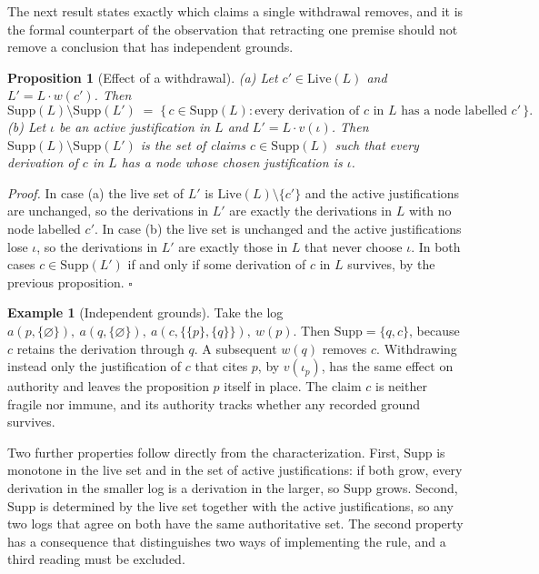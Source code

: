 \documentclass[11pt]{article}
\theoremstyle{plain}
\newtheorem{proposition}{Proposition}
\theoremstyle{definition}
\newtheorem{example}{Example}
\theoremstyle{remark}
\begin{document}
The next result states exactly which claims a single withdrawal removes, and it is the formal counterpart of the observation that retracting one premise should not remove a conclusion that has independent grounds.

\begin{proposition}[Effect of a withdrawal]
(a) Let $c'\in\mathrm{Live}(L)$ and $L'=L\cdot w(c')$. Then
\[
\mathrm{Supp}(L)\setminus\mathrm{Supp}(L') \;=\; \{\,c\in\mathrm{Supp}(L) : \text{every derivation of } c \text{ in } L \text{ has a node labelled } c'\,\}.
\]
(b) Let $\iota$ be an active justification in $L$ and $L'=L\cdot v(\iota)$. Then $\mathrm{Supp}(L)\setminus\mathrm{Supp}(L')$ is the set of claims $c\in\mathrm{Supp}(L)$ such that every derivation of $c$ in $L$ has a node whose chosen justification is $\iota$.
\end{proposition}
\emph{Proof.} In case (a) the live set of $L'$ is $\mathrm{Live}(L)\setminus\{c'\}$ and the active justifications are unchanged, so the derivations in $L'$ are exactly the derivations in $L$ with no node labelled $c'$. In case (b) the live set is unchanged and the active justifications lose $\iota$, so the derivations in $L'$ are exactly those in $L$ that never choose $\iota$. In both cases $c\in\mathrm{Supp}(L')$ if and only if some derivation of $c$ in $L$ survives, by the previous proposition. \hfill$\square$

\begin{example}[Independent grounds]
Take the log $a(p,\{\varnothing\}),\ a(q,\{\varnothing\}),\ a(c,\{\{p\},\{q\}\}),\ w(p)$. Then $\mathrm{Supp}=\{q,c\}$, because $c$ retains the derivation through $q$. A subsequent $w(q)$ removes $c$. Withdrawing instead only the justification of $c$ that cites $p$, by $v(\iota_p)$, has the same effect on authority and leaves the proposition $p$ itself in place. The claim $c$ is neither fragile nor immune, and its authority tracks whether any recorded ground survives.
\end{example}

Two further properties follow directly from the characterization. First, $\mathrm{Supp}$ is monotone in the live set and in the set of active justifications: if both grow, every derivation in the smaller log is a derivation in the larger, so $\mathrm{Supp}$ grows. Second, $\mathrm{Supp}$ is determined by the live set together with the active justifications, so any two logs that agree on both have the same authoritative set. The second property has a consequence that distinguishes two ways of implementing the rule, and a third reading must be excluded.
\end{document}
